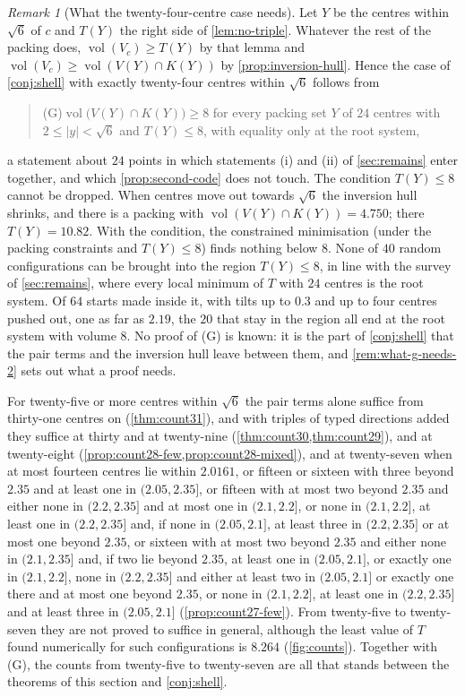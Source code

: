 \documentclass[11pt,reqno]{amsart}
\renewcommand{\_}{\origunderscore\allowbreak}
\numberwithin{equation}{section}
\theoremstyle{plain}
\theoremstyle{definition}
\theoremstyle{remark}
\newtheorem{remark}[thm]{Remark}
\DeclareMathOperator{\vol}{vol}
\begin{document}
\begin{remark}[What the twenty-four-centre case needs]\label{rem:what-g-needs}
Let $Y$ be the centres within $\sqrt6$ of $c$ and $T(Y)$ the right side of
\cref{lem:no-triple}. Whatever the rest of the packing does,
$\vol(V_c)\ge T(Y)$ by that lemma and $\vol(V_c)\ge\vol(V(Y)\cap K(Y))$ by
\cref{prop:inversion-hull}. Hence the case of \cref{conj:shell} with exactly
twenty-four centres within $\sqrt6$ follows from
\begin{quote}
(G)\quad $\vol\bigl(V(Y)\cap K(Y)\bigr)\ge8$ for every packing set $Y$ of $24$
centres with $2\le|y|<\sqrt6$ and $T(Y)\le8$, with equality only at the root
system,
\end{quote}
a statement about $24$ points in which statements (i) and (ii) of
\cref{sec:remains} enter together, and which \cref{prop:second-code} does
not touch. The condition $T(Y)\le8$ cannot be dropped. When centres move
out towards $\sqrt6$ the inversion hull shrinks, and there is a packing with
$\vol(V(Y)\cap K(Y))=4.750$; there $T(Y)=10.82$. With the condition, the
constrained minimisation (under the packing constraints and $T(Y)\le8$) finds
nothing below $8$. None of $40$ random configurations can be brought into
the region $T(Y)\le8$, in line with the survey of \cref{sec:remains}, where
every local minimum of $T$ with $24$ centres is the root system. Of $64$
starts made inside it, with tilts up to $0.3$ and up to four centres pushed
out, one as far as $2.19$, the $20$ that stay in the region all end at the
root system with volume $8$. No proof of (G) is known: it is the part of
\cref{conj:shell} that the pair terms and the inversion hull leave between
them, and \cref{rem:what-g-needs-2} sets out what a proof needs.
\end{remark}

For twenty-five or more centres within $\sqrt6$ the pair terms alone
suffice from thirty-one centres on (\cref{thm:count31}), and with triples
of typed directions added they suffice at thirty and at twenty-nine
(\cref{thm:count30,thm:count29}), and at twenty-eight
(\cref{prop:count28-few,prop:count28-mixed}), and at twenty-seven when at most
fourteen centres lie within $2.0161$, or fifteen or sixteen with three
beyond $2.35$ and at least one in $(2.05,2.35]$, or fifteen with at most
two beyond $2.35$ and either none in $(2.2,2.35]$ and at most one in $(2.1,2.2]$, or none in $(2.1,2.2]$, at least one in $(2.2,2.35]$ and, if none in $(2.05,2.1]$, at least three in $(2.2,2.35]$ or at most one beyond $2.35$, or sixteen with at most two beyond $2.35$
and either none in $(2.1,2.35]$ and, if two lie beyond $2.35$, at least one in $(2.05,2.1]$, or exactly one in $(2.1,2.2]$, none in $(2.2,2.35]$ and either at least two in $(2.05,2.1]$ or exactly one there and at most one beyond $2.35$, or none in $(2.1,2.2]$, at least one in $(2.2,2.35]$ and at least three in $(2.05,2.1]$ (\cref{prop:count27-few}). From twenty-five to
twenty-seven they are not proved to suffice in general, although the least value of $T$ found numerically for
such configurations is $8.264$ (\cref{fig:counts}). Together with (G), the
counts from twenty-five to twenty-seven are all that stands between the
theorems of this section and
\cref{conj:shell}.
\end{document}
